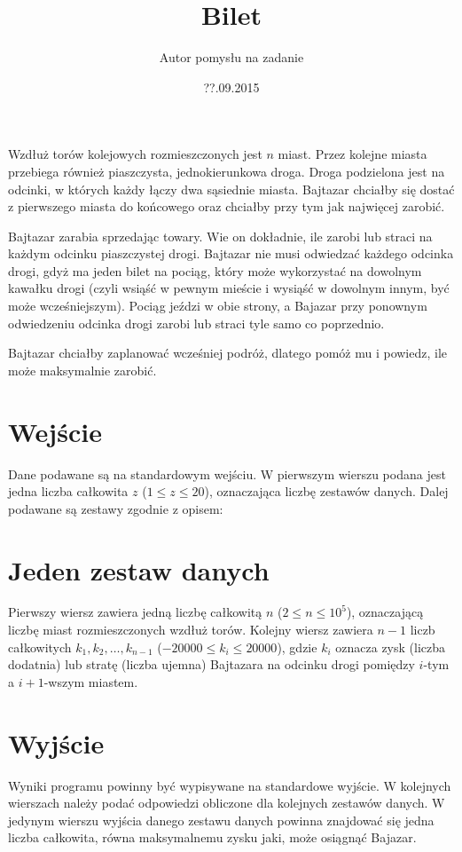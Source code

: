 \documentclass[zad,zawodnik,utf8]{sinol}
\title{Bilet}
\date{??.09.2015}
\author{Autor pomysłu na zadanie}
\begin{document}
  \begin{tasktext}%
Wzdłuż torów kolejowych rozmieszczonych jest $n$ miast. Przez kolejne miasta przebiega również piaszczysta, jednokierunkowa droga. Droga podzielona jest na odcinki, w których każdy łączy dwa sąsiednie miasta. Bajtazar chciałby się dostać z pierwszego miasta do końcowego oraz chciałby przy tym jak najwięcej zarobić.

Bajtazar zarabia sprzedając towary. Wie on dokładnie, ile zarobi lub straci na każdym odcinku piaszczystej drogi. Bajtazar nie musi odwiedzać każdego odcinka drogi, gdyż ma jeden bilet na pociąg, który może wykorzystać na dowolnym kawałku drogi (czyli wsiąść w pewnym mieście i wysiąść w dowolnym innym, być może wcześniejszym). Pociąg jeździ w obie strony, a Bajazar przy ponownym odwiedzeniu odcinka drogi zarobi lub straci tyle samo co poprzednio.

Bajtazar chciałby zaplanować wcześniej podróż, dlatego pomóż mu i powiedz, ile może maksymalnie zarobić.

\section{Wejście}
Dane podawane są na standardowym wejściu. W pierwszym wierszu podana jest
jedna liczba całkowita $z$ ($1 \leq z \leq 20$), oznaczająca liczbę zestawów danych. Dalej podawane są zestawy zgodnie z opisem:

\section{Jeden zestaw danych}

Pierwszy wiersz zawiera jedną liczbę całkowitą $n$ ($2 \leq n \leq 10^5$),
oznaczającą liczbę miast rozmieszczonych wzdłuż torów. Kolejny wiersz zawiera $n-1$ liczb całkowitych $k_1, k_2, \ldots, k_{n-1}$ ($-20000 \leq k_i \leq 20000$), gdzie $k_i$ oznacza zysk (liczba dodatnia) lub stratę (liczba ujemna) Bajtazara na odcinku drogi pomiędzy $i$-tym a $i+1$-wszym miastem.

\section{Wyjście}

Wyniki programu powinny być wypisywane na standardowe wyjście. W kolejnych wierszach należy podać odpowiedzi obliczone dla kolejnych zestawów danych. W jedynym wierszu wyjścia danego zestawu danych powinna znajdować się jedna liczba całkowita, równa maksymalnemu zysku jaki, może osiągnąć Bajazar.

     \makecompactexample

  \end{tasktext}
\end{document}
